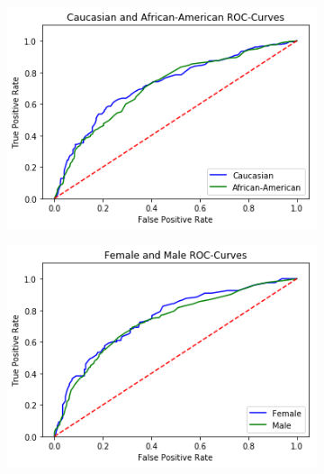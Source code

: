 \documentclass[11pt, fleqn, titlepage]{article}
\begin{document}
	\begin{figure}[H]
		\centering
		\begin{subfigure}{0.5\textwidth}
			\centering
			\includegraphics[width=0.9\linewidth]{imgs/ROC.png}
		\end{subfigure}%
		\begin{subfigure}{0.5\textwidth}
			\centering
			\includegraphics[width=0.9\linewidth]{imgs/ROC_sex.png}
		\end{subfigure}
	

\end{figure}
\end{document}
